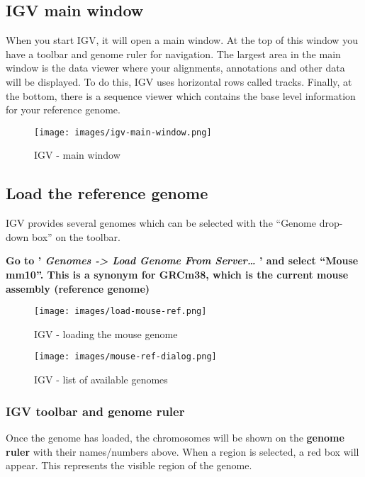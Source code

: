 \documentclass[11pt]{article}
\begin{document}
    \hypertarget{igv-main-window}{%
\subsection{IGV main window}\label{igv-main-window}}

When you start IGV, it will open a main window. At the top of this
window you have a toolbar and genome ruler for navigation. The largest
area in the main window is the data viewer where your alignments,
annotations and other data will be displayed. To do this, IGV uses
horizontal rows called tracks. Finally, at the bottom, there is a
sequence viewer which contains the base level information for your
reference genome.

    \begin{figure}
\centering
\texttt{[image: images/igv-main-window.png]}
\caption{IGV - main window}
\end{figure}

    \hypertarget{load-the-reference-genome}{%
\subsection{Load the reference genome}\label{load-the-reference-genome}}

IGV provides several genomes which can be selected with the ``Genome
drop-down box'' on the toolbar.

\textbf{Go to ' \textit{Genomes -\textgreater{} Load Genome From
Server\ldots{}} ' and select ``Mouse mm10''. This is a synonym for
GRCm38, which is the current mouse assembly (reference genome)}

    \begin{figure}
\centering
\texttt{[image: images/load-mouse-ref.png]}
\caption{IGV - loading the mouse genome}
\end{figure}

    \begin{figure}
\centering
\texttt{[image: images/mouse-ref-dialog.png]}
\caption{IGV - list of available genomes}
\end{figure}

    \hypertarget{igv-toolbar-and-genome-ruler}{%
\subsubsection{IGV toolbar and genome
ruler}\label{igv-toolbar-and-genome-ruler}}

Once the genome has loaded, the chromosomes will be shown on the
\textbf{genome ruler} with their names/numbers above. When a region is
selected, a red box will appear. This represents the visible region of
the genome.
\end{document}
